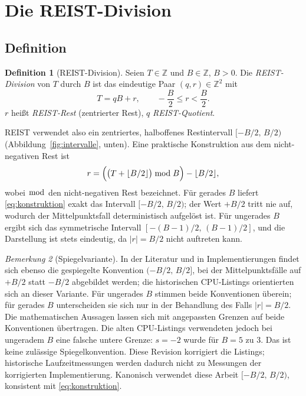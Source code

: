 \documentclass[11pt,a4paper]{scrartcl}
\theoremstyle{definition}
\newtheorem{definition}{Definition}[section]
\theoremstyle{plain}
\theoremstyle{remark}
\newtheorem{bemerkung}[definition]{Bemerkung}
\newcommand{\Z}{\mathbb{Z}}
\begin{document}
\section{Die REIST-Division}
\label{sec:theorie}

\subsection{Definition}

\begin{definition}[REIST-Division]
\label{def:reist}
Seien $T \in \Z$ und $B \in \Z$, $B > 0$. Die \emph{REIST-Division} von $T$ durch $B$ ist das eindeutige Paar $(q, r) \in \Z^2$ mit
\begin{equation}
T = qB + r, \qquad -\frac{B}{2} \le r < \frac{B}{2}.
\label{eq:reistdef}
\end{equation}
$r$ heißt \emph{REIST-Rest} (zentrierter Rest), $q$ \emph{REIST-Quotient}.
\end{definition}

REIST verwendet also ein zentriertes, halboffenes Restintervall $[-B/2,\, B/2)$ (Abbildung~\ref{fig:intervalle}, unten). Eine praktische Konstruktion aus dem nicht-negativen Rest ist
\begin{equation}
r = \Bigl( \bigl(T + \lfloor B/2 \rfloor\bigr) \bmod B \Bigr) - \lfloor B/2 \rfloor,
\label{eq:konstruktion}
\end{equation}
wobei $\bmod$ den nicht-negativen Rest bezeichnet. Für gerades $B$ liefert \eqref{eq:konstruktion} exakt das Intervall $[-B/2,\, B/2)$; der Wert $+B/2$ tritt nie auf, wodurch der Mittelpunktsfall deterministisch aufgelöst ist. Für ungerades $B$ ergibt sich das symmetrische Intervall $[-(B-1)/2,\, (B-1)/2]$, und die Darstellung ist stets eindeutig, da $|r| = B/2$ nicht auftreten kann.

\begin{bemerkung}[Spiegelvariante]
\label{bem:variante}
In der Literatur und in Implementierungen findet sich ebenso die gespiegelte Konvention $(-B/2,\, B/2]$, bei der Mittelpunktsfälle auf $+B/2$ statt $-B/2$ abgebildet werden; die historischen CPU-Listings orientierten sich an dieser Variante. Für ungerades $B$ stimmen beide Konventionen überein; für gerades $B$ unterscheiden sie sich nur in der Behandlung des Falls $|r| = B/2$. Die mathematischen Aussagen lassen sich mit angepassten Grenzen auf beide Konventionen übertragen. Die alten CPU-Listings verwendeten jedoch bei ungeradem $B$ eine falsche untere Grenze: $s=-2$ wurde für $B=5$ zu $3$. Das ist keine zulässige Spiegelkonvention. Diese Revision korrigiert die Listings; historische Laufzeitmessungen werden dadurch nicht zu Messungen der korrigierten Implementierung. Kanonisch verwendet diese Arbeit $[-B/2,\, B/2)$, konsistent mit \eqref{eq:konstruktion}.
\end{bemerkung}
\end{document}
